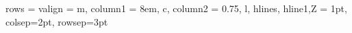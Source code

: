 
\vspace*{\fill}
\small

\begin{center}
\begin{tblr}
{
    rows = {valign = m},
    column{1} = {8em, c},
    column{2} = {0.75\textwidth, l},
    hlines,
    hline{1,Z} = {1pt},
    colsep=2pt,
    rowsep=3pt
}


\end{tblr}
\end{center}
